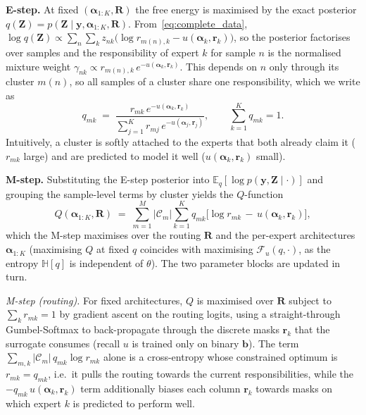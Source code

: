\textbf{E-step.} At fixed $(\boldsymbol{\alpha}_{1:K}, \mathbf{R})$ the
free energy is maximised by the exact posterior
$q(\mathbf{Z}) = p(\mathbf{Z}\mid \mathbf{y}, \boldsymbol{\alpha}_{1:K}, \mathbf{R})$.
From~\eqref{eq:complete_data},
$\log q(\mathbf{Z}) \propto \sum_{n}\sum_{k} z_{nk}\bigl(\log r_{m(n),k}
- u(\boldsymbol{\alpha}_k, \mathbf{r}_k)\bigr)$, so the posterior
factorises over samples and the responsibility of expert $k$ for sample
$n$ is the normalised mixture weight
$\gamma_{nk} \propto r_{m(n),k}\, e^{-u(\boldsymbol{\alpha}_k, \mathbf{r}_k)}$.
This depends on $n$ only through its cluster $m(n)$, so all samples of a
cluster share one responsibility, which we write as
\begin{equation}
\label{eq:estep}
q_{mk} \;=\; \frac{r_{mk}\, e^{-u(\boldsymbol{\alpha}_k, \mathbf{r}_k)}}
{\sum_{j=1}^{K} r_{mj}\, e^{-u(\boldsymbol{\alpha}_j, \mathbf{r}_j)}},
\qquad \sum_{k=1}^{K} q_{mk} = 1.
\end{equation}
Intuitively, a cluster is softly attached to the experts that both
already claim it ($r_{mk}$ large) and are predicted to model it well
($u(\boldsymbol{\alpha}_k, \mathbf{r}_k)$ small).

\textbf{M-step.} Substituting the E-step posterior into
$\mathbb{E}_q[\log p(\mathbf{y}, \mathbf{Z}\mid\cdot)]$ and grouping the
sample-level terms by cluster yields the $Q$-function
\begin{equation}
\label{eq:qfun_main}
Q(\boldsymbol{\alpha}_{1:K}, \mathbf{R})
\;=\; \sum_{m=1}^{M} |\mathcal{C}_m| \sum_{k=1}^{K} q_{mk}
\bigl[\log r_{mk} \,-\, u(\boldsymbol{\alpha}_k, \mathbf{r}_k)\bigr],
\end{equation}
which the M-step maximises over the routing $\mathbf{R}$ and the
per-expert architectures $\boldsymbol{\alpha}_{1:K}$ (maximising $Q$ at
fixed $q$ coincides with maximising $\mathcal{F}_u(q, \cdot)$, as the
entropy $\mathbb{H}[q]$ is independent of $\theta$). The two parameter
blocks are updated in turn.

\emph{M-step (routing).} For fixed architectures, $Q$ is maximised over
$\mathbf{R}$ subject to $\sum_k r_{mk}=1$ by gradient ascent on the
routing logits, using a straight-through Gumbel-Softmax to back-propagate
through the discrete masks $\mathbf{r}_k$ that the surrogate consumes
(recall $u$ is trained only on binary $\mathbf{b}$). The term
$\sum_{m,k} |\mathcal{C}_m|\, q_{mk}\log r_{mk}$ alone is a cross-entropy
whose constrained optimum is $r_{mk}=q_{mk}$, i.e.\ it pulls the routing
towards the current responsibilities, while the
$-q_{mk}\,u(\boldsymbol{\alpha}_k, \mathbf{r}_k)$ term additionally
biases each column $\mathbf{r}_k$ towards masks on which expert $k$ is
predicted to perform well.

